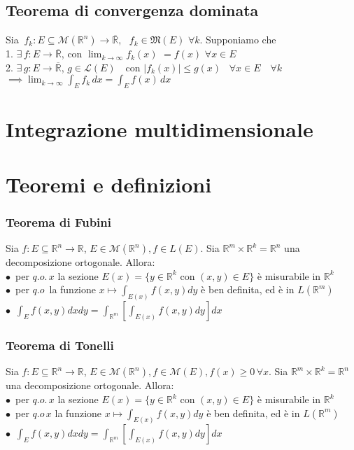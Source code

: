 \documentclass{article} %
\begin{document}
    \subsection*{Teorema di convergenza dominata}
    Sia $ \ f_k: E \subseteq \mathcal{M} (\mathbb{R} ^n) \to \overline{\mathbb{R}} , \,\,\,\, f_k \in \mathfrak{M} (E) \,\, \forall k$. Supponiamo che \\ 1. $\exists \, f: E \to \overline{\mathbb{R}} $, con $\lim_{k \to \infty} f_k(x) $ $= f(x)$ $\forall x \in E$ \\ 2. $\exists \, g: E \to \overline{\mathbb{R}} $, $g \in \mathcal{L} (E)$ \,\, con $|f_k(x)| \leq g(x) \,\,\,\,\, \forall x \in E \,\,\,\,\,\, \forall k$
    $ \implies \lim_{k \to \infty} \int_{E}^{}f_k \,dx = \int_{E}^{}f(x) \,dx $
  

    \section{Integrazione multidimensionale}

    \section{Teoremi e definizioni}
    
    \subsubsection*{Teorema di Fubini}
    Sia $f:E \subseteq \mathbb{R}^n \to \mathbb{R}$, $E \in \mathcal{M}(\mathbb{R}^n), f \in L(E)$. Sia $\mathbb{R}^m \times \mathbb{R}^k = \mathbb{R}^n$ una decomposizione ortogonale. Allora: \\
    $\bullet \,$ per $q.o. \, x$ la sezione $E(x) = \{y \in \mathbb{R}^k$ con $(x,y) \in E \}$ è misurabile in $\mathbb{R}^k$ \\
    $\bullet \,$ per $q.o \, $ la funzione $x \mapsto \int_{E(x)} f(x,y)dy$ è ben definita, ed è in $L(\mathbb{R}^m)$ \\
    $\bullet \,$ $\int_E f(x,y) dx dy = \int_{\mathbb{R}^m} \left[\int_{E(x)} f(x,y) dy\right] dx$
  
    \subsubsection*{Teorema di Tonelli}
    Sia $f:E \subseteq \mathbb{R}^n \to \mathbb{R}$, $E \in \mathcal{M}(\mathbb{R}^n), f \in \mathcal{M}(E), f(x) \geq 0 \, \forall x$. Sia $\mathbb{R}^m \times \mathbb{R}^k = \mathbb{R}^n$ una decomposizione ortogonale. Allora: \\
    $\bullet \,$ per $q.o. \, x$ la sezione $E(x) = \{y \in \mathbb{R}^k$ con $(x,y) \in E \}$ è misurabile in $\mathbb{R}^k$ \\
    $\bullet \,$ per $q.o \, x$ la funzione $x \mapsto \int_{E(x)} f(x,y)dy$ è ben definita, ed è in $L(\mathbb{R}^m)$ \\
    $\bullet \,$ $\int_E f(x,y) dx dy = \int_{\mathbb{R}^m} \left[\int_{E(x)} f(x,y) dy\right] dx$
\end{document}
